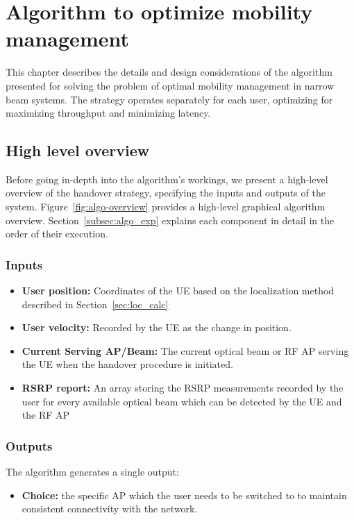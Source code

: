 \chapter{Algorithm to optimize mobility management}
\label{chp:problem_statement}

This chapter describes the details and design considerations of the algorithm presented for solving the problem of optimal mobility management in narrow beam systems. The strategy operates separately for each user, optimizing for maximizing throughput and minimizing latency.
\section{High level overview}
Before going in-depth into the algorithm's workings, we present a high-level overview of the handover strategy, specifying the inputs and outputs of the system. Figure~\ref{fig:algo-overview} provides a high-level graphical algorithm overview. Section~\ref{subsec:algo_exp} explains each component in detail in the order of their execution.
\subsection{Inputs}
\begin{itemize}
    \item \textbf{User position:} Coordinates of the UE based on the localization method described in Section~\ref{sec:loc_calc}
    \item \textbf{User velocity:} Recorded by the UE as the change in position. 
    \item \textbf{Current Serving AP/Beam:} The current optical beam or RF AP serving the UE when the handover procedure is initiated.
    \item \textbf{RSRP report:} An array storing the RSRP measurements recorded by the user for every available optical beam which can be detected by the UE and the RF AP
\end{itemize}
\subsection{Outputs}
The algorithm generates a single output:
\begin{itemize}
    \item \textbf{Choice:} the specific AP which the user needs to be switched to to maintain consistent connectivity with the network.
\end{itemize}


